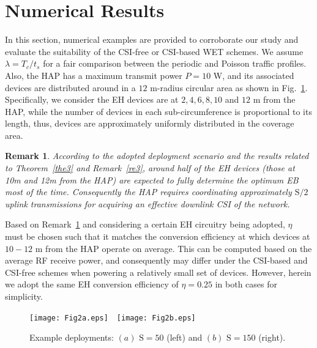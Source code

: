 \documentclass[10pt,journal,a4paper]{IEEEtran}
\newtheorem{remark}{Remark}
\begin{document}
	\section{Numerical Results}\label{results}
	In this section, numerical examples are provided to corroborate our study and evaluate the suitability of the CSI-free or CSI-based WET schemes. We assume $\lambda=T_c/t_s$ for a fair comparison between the periodic and Poisson traffic profiles. Also, the HAP has a maximum transmit power $P=10$ W, and its associated devices are distributed around in a $12$ m-radius circular area as shown in Fig.~\ref{Fig2}. Specifically, we consider the EH devices are at $2,4,6,8,10$ and $12$ m from the HAP, while the number of devices in each sub-circumference is proportional to its length, thus, devices are approximately uniformly distributed in the coverage area. 
%
	\begin{remark}\label{re9}
		According to the adopted deployment scenario and the results related to Theorem~\ref{the3} and Remark~\ref{re3}, around half of the EH devices (those at 10m and 12m from the HAP) are expected to fully determine the optimum EB most of the time. Consequently the HAP requires coordinating approximately  $\mathrm{S}/2$ uplink transmissions for acquiring an effective downlink CSI of the network.
	\end{remark}

    Based on Remark~\ref{re9} and considering a certain EH circuitry being adopted, $\eta$ must be chosen such that it matches the conversion efficiency at which devices at $10-12$ m from the HAP operate on average. This can be computed based on the average RF receive power, and consequently may differ under the CSI-based and CSI-free schemes when powering a relatively small set of devices. However, herein we adopt the same EH conversion efficiency of $\eta=0.25$ in both cases for simplicity.
   	\begin{figure}[t!]
    	\centering  
    	\texttt{[image: Fig2a.eps]}\qquad\qquad\ \  \texttt{[image: Fig2b.eps]}		
    	\caption{Example deployments: $(a)$ $\mathrm{S}=50$ (left) and $(b)$ $\mathrm{S}=150$ (right).}		
    	\label{Fig2}
    \end{figure}
   	
\end{document}
